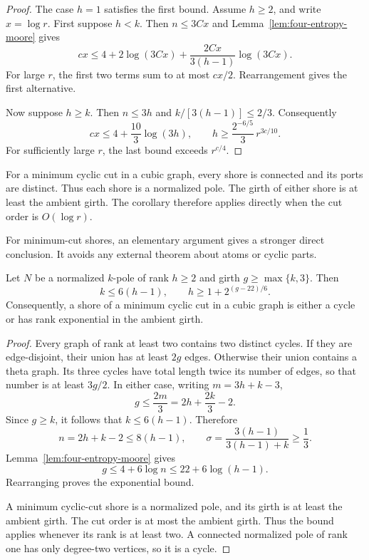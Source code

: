 \begin{proof}
The case $h=1$ satisfies the first bound.
Assume $h\ge2$, and write $x=\log r$.
First suppose $h<k$.
Then $n\le3Cx$ and Lemma~\ref{lem:four-entropy-moore} gives
\[
 cx\le4+2\log(3Cx)
       +\frac{2Cx}{3(h-1)}\log(3Cx).
\]
For large $r$, the first two terms sum to at most $cx/2$.
Rearrangement gives the first alternative.

Now suppose $h\ge k$.
Then $n\le3h$ and $k/[3(h-1)]\le2/3$.
Consequently
\[
 cx\le4+\frac{10}{3}\log(3h),
 \qquad
 h\ge\frac{2^{-6/5}}{3}\,r^{3c/10}.
\]
For sufficiently large $r$, the last bound exceeds $r^{c/4}$.
\end{proof}

For a minimum cyclic cut in a cubic graph, every shore is connected and its ports are distinct.
Thus each shore is a normalized pole.
The girth of either shore is at least the ambient girth.
The corollary therefore applies directly when the cut order is $O(\log r)$.

For minimum-cut shores, an elementary argument gives a stronger direct conclusion.
It avoids any external theorem about atoms or cyclic parts.

\begin{corollary}
\label{cor:four-minimum-shore-exponential-rank}
Let $N$ be a normalized $k$-pole of rank $h\ge2$ and girth $g\ge\max\{k,3\}$.
Then
\[
 k\le6(h-1),\qquad
 h\ge1+2^{(g-22)/6}.
\]
Consequently, a shore of a minimum cyclic cut in a cubic graph is either a cycle or has rank exponential in the ambient girth.
\end{corollary}

\begin{proof}
Every graph of rank at least two contains two distinct cycles.
If they are edge-disjoint, their union has at least $2g$ edges.
Otherwise their union contains a theta graph.
Its three cycles have total length twice its number of edges, so that number is at least $3g/2$.
In either case, writing $m=3h+k-3$,
\[
 g\le\frac{2m}{3}=2h+\frac{2k}{3}-2.
\]
Since $g\ge k$, it follows that $k\le6(h-1)$.
Therefore
\[
 n=2h+k-2\le8(h-1),\qquad
 \sigma=\frac{3(h-1)}{3(h-1)+k}\ge\frac13.
\]
Lemma~\ref{lem:four-entropy-moore} gives
\[
 g\le4+6\log n\le22+6\log(h-1).
\]
Rearranging proves the exponential bound.

A minimum cyclic-cut shore is a normalized pole, and its girth is at least the ambient girth.
The cut order is at most the ambient girth.
Thus the bound applies whenever its rank is at least two.
A connected normalized pole of rank one has only degree-two vertices, so it is a cycle.
\end{proof}

